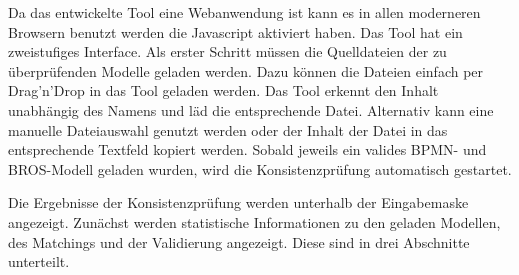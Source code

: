 Da das entwickelte Tool eine Webanwendung ist kann es in allen moderneren Browsern benutzt werden die Javascript aktiviert haben.
Das Tool hat ein zweistufiges Interface.
Als erster Schritt müssen die Quelldateien der zu überprüfenden Modelle geladen werden.
Dazu können die Dateien einfach per Drag'n'Drop in das Tool geladen werden.
Das Tool erkennt den Inhalt unabhängig des Namens und läd die entsprechende Datei.
Alternativ kann eine manuelle Dateiauswahl genutzt werden oder der Inhalt der Datei in das entsprechende Textfeld kopiert werden.
Sobald jeweils ein valides BPMN- und BROS-Modell geladen wurden, wird die Konsistenzprüfung automatisch gestartet.

Die Ergebnisse der Konsistenzprüfung werden unterhalb der Eingabemaske angezeigt.
Zunächst werden statistische Informationen zu den geladen Modellen, des Matchings und der Validierung angezeigt.
Diese sind in drei Abschnitte unterteilt.
